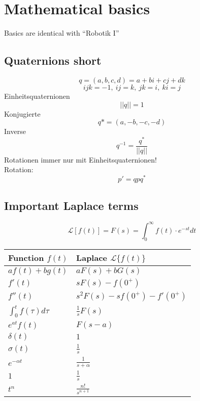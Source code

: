 

\section{Mathematical basics}%
\label{mat:sec:mathematical_basics}
Basics are identical with \enquote{Robotik I}

\subsection{Quaternions short}%
\label{mat:sub:quaternione_short}
\[ q = (a, b, c, d) = a + bi + cj + dk\]
\[ ijk = -1,\ ij = k,\ jk = i,\ ki = j\]
Einheitsquaternionen
\[ ||q|| = 1\]
Konjugierte
\[ q* = (a, -b, -c, -d)\]
Inverse
\[ q^{-1} = \frac{q^*}{||q||}\]
Rotationen immer nur mit Einheitsquaternionen!\\
Rotation:
\[ p' = qpq^*\]

\subsection{Important Laplace terms}%
\label{mat:sub:important_laplace_terms}
\[\mathcal{L}\left[f(t)\right] = F(s) = \int_0^\infty f(t) \cdot e^{-st} dt\]
\begin{tabular}{l|l}
  Function \(f(t)\) & Laplace \(\mathcal{L}\{f(t)\}\)\\\hline
  \(a f(t) + b g(t)\) & \(aF(s)+bG(s)\)\\
  \(f'(t)\) & \(sF(s) - f(0^+)\)\\
  \(f''(t)\) & \(s^2 F(s) - sf(0^+) - f'(0^+)\) \\
  \(\int_0^t f(\tau)d\tau\) & \(\frac{1}{s} F(s)\)\\
  \(e^{at} f(t)\) & \(F(s - a)\)\\
  \(\delta(t)\) & \(1\)\\
  \(\sigma(t)\) & \(\frac{1}{s}\)\\
  \( e^{-\alpha t}\) & \(\frac{1}{s + \alpha}\)\\
  \(1\) & \(\frac{1}{s}\)\\
  \(t^n\) & \(\frac{n!}{s^{n+1}}\)\\
\end{tabular}